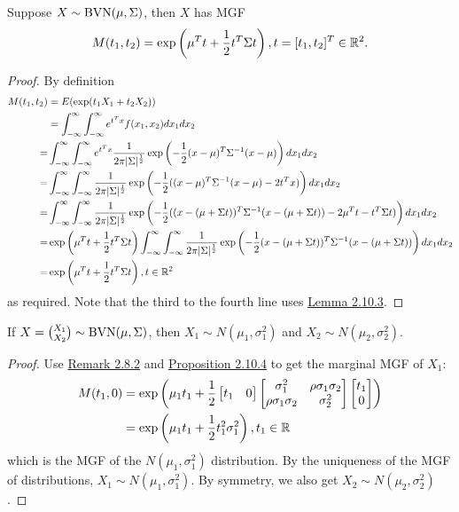 \documentclass[11pt,fleqn]{book} %
\begin{document}
\begin{proposition} \label{prop:2104}
Suppose \(X \sim \operatorname{BVN}(\mu, \Sigma)\), then \(X\) has MGF
\[
M(t_1, t_2) = \exp\left(\mu^Tt + \frac12 t^T \Sigma t\right), t = [t_1, t_2]^T \in \mathbb{R}^2.
\]
\end{proposition}
\begin{proof} By definition
\[
\begin{aligned}
M(t_1, t_2) &= E(\exp(t_1X_1 + t_2X_2)) \\
&= \int_{-\infty}^\infty\int_{-\infty}^\infty e^{t^Tx}f(x_1, x_2)dx_1dx_2 \\
= &\int_{-\infty}^\infty\int_{-\infty}^\infty e^{t^Tx}\frac{1}{2\pi|\Sigma|^{\frac12}} \exp\left(-\frac12(x - \mu)^T\Sigma^{-1}(x - \mu)\right)dx_1dx_2 \\
= &\int_{-\infty}^\infty\int_{-\infty}^\infty\frac{1}{2\pi|\Sigma|^{\frac12}}\exp\left(-\frac12((x - \mu)^T\Sigma^{-1}(x - \mu) - 2t^Tx)\right)dx_1dx_2 \\
= &\int_{-\infty}^\infty\int_{-\infty}^\infty\frac{1}{2\pi|\Sigma|^{\frac12}}\exp\left(-\frac12((x - (\mu + \Sigma t))^T\Sigma^{-1}(x - (\mu + \Sigma t)) - 2\mu^T t - t^T\Sigma t)\right)dx_1dx_2\\
= &\exp\left(\mu^T t + \frac12 t^T\Sigma t\right) \int_{-\infty}^\infty\int_{-\infty}^\infty\frac{1}{2\pi|\Sigma|^{\frac12}}\exp\left(-\frac12(x - (\mu + \Sigma t))^T\Sigma^{-1}(x - (\mu + \Sigma t))\right)dx_1dx_2 \\
= &\exp\left(\mu^Tt + \frac12 t^T\Sigma t\right), t \in \mathbb{R}^2
\end{aligned}
\]
as required. Note that the third to the fourth line uses \hyperref[lemma:2103]{Lemma 2.10.3}.
\end{proof}

\begin{corollary} \label{cor:2105}
If \(X = \binom{X_1}{X_2} \sim \operatorname{BVN}(\mu, \Sigma)\), then \(X_1 \sim N(\mu_1, \sigma_1^2)\) and \(X_2 \sim N(\mu_2, \sigma_2^2)\).
\end{corollary}
\begin{proof} Use \hyperref[rmk:282]{Remark 2.8.2} and \hyperref[prop:2104]{Proposition 2.10.4} to get the marginal MGF of \(X_1\):
\[
\begin{aligned}
M(t_1, 0) &= \exp\left(\mu_1t_1 + \frac12\begin{bmatrix}t_1 & 0\end{bmatrix}
\begin{bmatrix} \sigma_1^2 & \rho\sigma_1\sigma_2 \\
\rho\sigma_1\sigma_2 & \sigma_2^2
\end{bmatrix}
\begin{bmatrix} t_1 \\ 0\end{bmatrix}\right) \\
&= \exp\left(\mu_1t_1 + \frac12 t_1^2\sigma_1^2\right), t_1 \in \mathbb{R}
\end{aligned}
\]
which is the MGF of the \(N(\mu_1, \sigma_1^2)\) distribution. By the uniqueness of the MGF of distributions, \(X_1 \sim N(\mu_1, \sigma_1^2)\). By symmetry, we also get \(X_2 \sim N(\mu_2, \sigma_2^2)\).
\end{proof}
\end{document}
